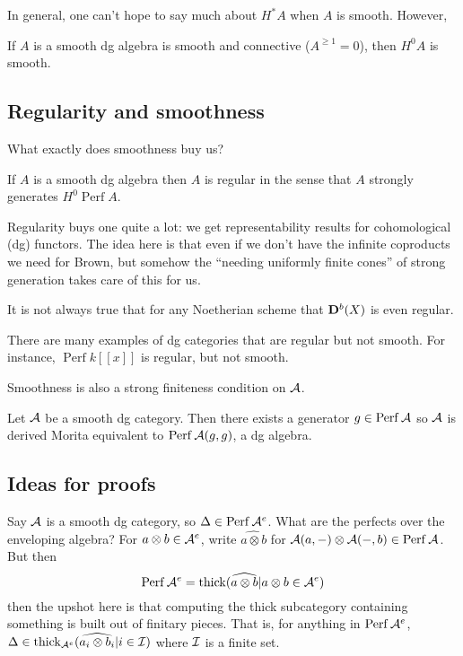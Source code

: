 \documentclass[12pt]{article}
\begin{document}
In general, one can't hope to say much about $H^\ast A$ when $A$ is smooth. However,
\begin{thm}[Raedschelder-S.]
	If $A$ is a smooth dg algebra is smooth and connective ($A^{\ge 1}=0$), then $H^0A$ is smooth.
\end{thm}

\subsection{Regularity and smoothness}
What exactly does smoothness buy us?
\begin{thm}
	If $A$ is a smooth dg algebra then $A$ is regular in the sense that $A$ strongly generates $H^0\operatorname{Perf}A$.
\end{thm}
Regularity buys one quite a lot: we get representability results for cohomological (dg) functors. The idea here is that even if we don't have the infinite coproducts we need for Brown,
but somehow the ``needing uniformly finite cones'' of strong generation takes care of this for us.

\begin{rmk}
	It is not always true that for any Noetherian scheme that $\mathbf{D}^b(X)$ is even regular.

	There are many examples of dg categories that are regular but not smooth. For instance, $\operatorname{Perf}k[[x]]$ is regular, but not smooth.
\end{rmk}

Smoothness is also a strong finiteness condition on $\mathcal{A}$. 
\begin{thm}[To\"en]
	Let $\mathcal{A}$ be a smooth dg category. Then there exists a generator $g\in\operatorname{Perf}\mathcal{A}$ so 
	$\mathcal{A}$ is derived Morita equivalent to $\operatorname{Perf}\mathcal{A}(g,g)$, a dg algebra.
\end{thm}

\subsection{Ideas for proofs}
Say $\mathcal{A}$ is a smooth dg category, so $\Delta\in\operatorname{Perf}\mathcal{A}^e$. What are the perfects over the enveloping algebra? For $a\otimes b\in \mathcal{A}^e$, 
write $\widehat{a\otimes b}$ for $\mathcal{A}(a,-)\otimes\mathcal{A}(-,b)\in\operatorname{Perf}\mathcal{A}$. But then 
\[\operatorname{Perf}\mathcal{A}^e=\operatorname{thick}(\widehat{a\otimes b}|a\otimes b\in\mathcal{A}^e)\]
then the upshot here is that computing the thick subcategory containing something is built out of finitary pieces. That is, 
for anything in $\operatorname{Perf}\mathcal{A}^e$, $\Delta\in\operatorname{thick}_{\mathcal{A}^e}(\widehat{a_i\otimes b_i}|i\in\mathcal{I})$
where $\mathcal{I}$ is a finite set.
\end{document}
